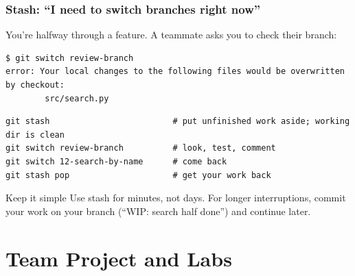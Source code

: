 \documentclass[aspectratio=169,10pt,compress]{beamer}
\begin{document}
\begin{frame}[t,fragile] \frametitle{Stash: ``I need to switch branches right now''}
  You're halfway through a feature. A teammate asks you to check their branch:
\begin{lstlisting}[language={}]
$ git switch review-branch
error: Your local changes to the following files would be overwritten by checkout:
        src/search.py
\end{lstlisting}

\begin{lstlisting}
git stash                         # put unfinished work aside; working dir is clean
git switch review-branch          # look, test, comment
git switch 12-search-by-name      # come back
git stash pop                     # get your work back
\end{lstlisting}

  \begin{alertblock}{Keep it simple}
    Use stash for minutes, not days. For longer interruptions, commit your work
    on your branch (``WIP: search half done'') and continue later.
  \end{alertblock}
\end{frame}

\section[Project]{Team Project and Labs}
\end{document}
